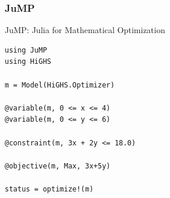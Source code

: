 \documentclass[usepdftitle=false]{beamer}
\begin{document}
\begin{frame}[fragile]
\frametitle{JuMP}

JuMP: Julia for Mathematical Optimization

\begin{verbatim}
using JuMP
using HiGHS

m = Model(HiGHS.Optimizer)

@variable(m, 0 <= x <= 4)
@variable(m, 0 <= y <= 6)

@constraint(m, 3x + 2y <= 18.0)

@objective(m, Max, 3x+5y)

status = optimize!(m)
\end{verbatim}

\end{frame}
\end{document}
